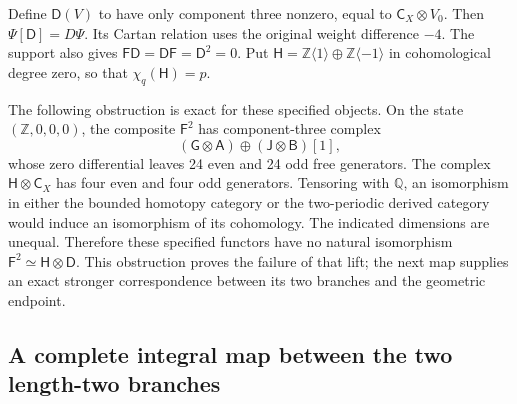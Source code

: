 Define \(\mathsf D(V)\) to have only component three nonzero, equal
to \(\mathsf C_X\otimes V_0\). Then
\(\Psi[\mathsf D]=D\Psi\). Its Cartan relation uses the original
weight difference \(-4\). The support also gives
\(\mathsf F\mathsf D=\mathsf D\mathsf F=\mathsf D^2=0\).
Put \(\mathsf H=\mathbb Z\langle1\rangle\oplus
\mathbb Z\langle-1\rangle\) in cohomological degree zero, so that
\(\chi_q(\mathsf H)=p\).

The following obstruction is exact for these specified objects.
On the state \((\mathbb Z,0,0,0)\), the composite
\(\mathsf F^2\) has component-three complex
\[
  (\mathsf G\otimes\mathsf A)
     \oplus(\mathsf J\otimes\mathsf B)[1],
\]
whose zero differential leaves 24 even and 24 odd free generators.
The complex \(\mathsf H\otimes\mathsf C_X\) has four even and four
odd generators. Tensoring with \(\mathbb Q\), an isomorphism in either
the bounded homotopy category or the two-periodic derived category
would induce an isomorphism of its cohomology. The indicated dimensions
are unequal. Therefore these specified functors have no natural
isomorphism \(\mathsf F^2\simeq\mathsf H\otimes\mathsf D\).
This obstruction proves the failure of that lift; the next map supplies
an exact stronger correspondence between its two branches and the
geometric endpoint.

\subsection{A complete integral map between the two length-two branches}

